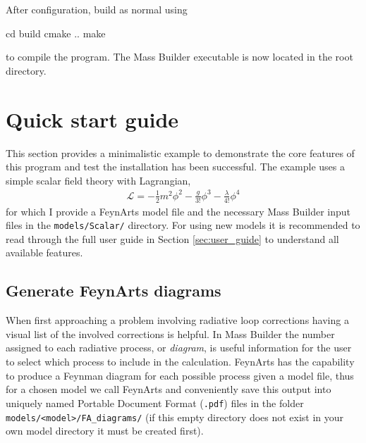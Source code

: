 After configuration, build as normal using
\begin{lstterm}
cd build
cmake ..
make
\end{lstterm}
to compile the program.  The Mass Builder executable is now located in the root directory.

\section{Quick start guide}

This section provides a minimalistic example to demonstrate the core features of this program and test the installation has been successful.  The example uses a simple scalar field theory with Lagrangian,
\begin{align}
\mathcal{L} = -\frac{1}{2}m^2\phi^2 - \frac{g}{3!}\phi^3-\frac{\lambda}{4!}\phi^4
\end{align}
for which I provide a FeynArts model file and the necessary Mass Builder input files in the \lstinline{models/Scalar/} directory.  For using new models it is recommended to read through the full user guide in Section \ref{sec:user_guide} to understand all available features.

\subsection{Generate FeynArts diagrams}\label{generate_diagrams}

When first approaching a problem involving radiative loop corrections having a visual list of the involved corrections is helpful.  In Mass Builder the number assigned to each radiative process, or \textit{diagram}, is useful information for the user to select which process to include in the calculation.  FeynArts has the capability to produce a Feynman diagram for each possible process given a model file, thus for a chosen model we call FeynArts and conveniently save this output into uniquely named Portable Document Format (\lstinline{.pdf}) files in the folder \lstinline{models/<model>/FA_diagrams/} (if this empty directory does not exist in your own model directory it must be created first).

